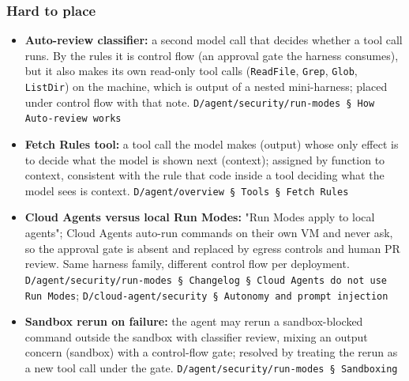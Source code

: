 \subsubsection*{Hard to place}
\begin{itemize}
\item \textbf{Auto-review classifier:} a second model call that decides whether a tool call runs. By the rules it is control flow (an approval gate the harness consumes), but it also makes its own read-only tool calls (\texttt{ReadFile}, \texttt{Grep}, \texttt{Glob}, \texttt{ListDir}) on the machine, which is output of a nested mini-harness; placed under control flow with that note. \texttt{D/\allowbreak{}agent/\allowbreak{}security/\allowbreak{}run-\allowbreak{}modes § How Auto-\allowbreak{}review works}
\item \textbf{Fetch Rules tool:} a tool call the model makes (output) whose only effect is to decide what the model is shown next (context); assigned by function to context, consistent with the rule that code inside a tool deciding what the model sees is context. \texttt{D/\allowbreak{}agent/\allowbreak{}overview § Tools § Fetch Rules}
\item \textbf{Cloud Agents versus local Run Modes:} "Run Modes apply to local agents"; Cloud Agents auto-run commands on their own VM and never ask, so the approval gate is absent and replaced by egress controls and human PR review. Same harness family, different control flow per deployment. \texttt{D/\allowbreak{}agent/\allowbreak{}security/\allowbreak{}run-\allowbreak{}modes § Changelog § Cloud Agents do not use Run Modes}; \texttt{D/\allowbreak{}cloud-\allowbreak{}agent/\allowbreak{}security § Autonomy and prompt injection}
\item \textbf{Sandbox rerun on failure:} the agent may rerun a sandbox-blocked command outside the sandbox with classifier review, mixing an output concern (sandbox) with a control-flow gate; resolved by treating the rerun as a new tool call under the gate. \texttt{D/\allowbreak{}agent/\allowbreak{}security/\allowbreak{}run-\allowbreak{}modes § Sandboxing}
\end{itemize}


